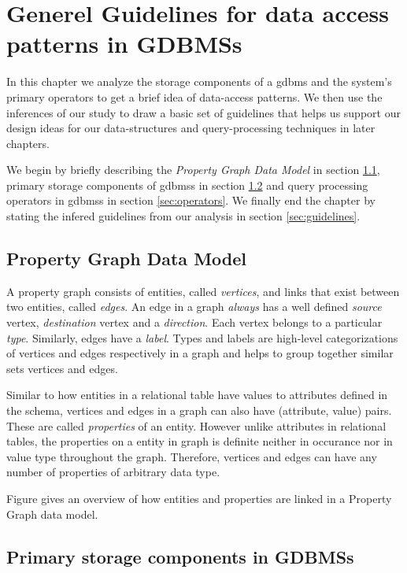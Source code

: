 \chapter{Generel Guidelines for data access patterns in GDBMSs}
\label{guidelines}

In this chapter we analyze the storage components of a \gls{gdbms} and the system's primary operators to get a brief idea of data-access patterns. We then use the inferences of our study to draw a basic set of guidelines that helps us support our design ideas for our data-structures and query-processing techniques in later chapters.

We begin by briefly describing the \emph{Property Graph Data Model} in section \ref{sec:property-graph-data-model}, primary storage components of \gls{gdbms}s in section \ref{sec:storage-components} and query processing operators in \gls{gdbms}s in section \ref{sec:operators}. We finally end the chapter by stating the infered guidelines from our analysis in section \ref{sec:guidelines}.

\section{Property Graph Data Model}
\label{sec:property-graph-data-model}

A property graph consists of entities, called \emph{vertices}, and links that exist between two entities, called \emph{edges}. An edge in a graph \emph{always} has a well defined \emph{source} vertex, \emph{destination} vertex and a \emph{direction}. Each vertex belongs to a particular \emph{type}. Similarly, edges have a \emph{label}. Types and labels are high-level categorizations of vertices and edges respectively in a graph and helps to group together similar sets vertices and edges.

Similar to how entities in a relational table have values to attributes defined in the schema, vertices and edges in a graph can also have (attribute, value) pairs. These are called \emph{properties} of an entity. However unlike attributes in relational tables, the properties on a entity in graph is definite neither in occurance nor in value type throughout the graph. Therefore, vertices and edges can have any number of properties of arbitrary data type.

Figure \cite{property} gives an overview of how entities and properties are linked in a Property Graph data model.

\section{Primary storage components in GDBMSs}
\label{sec:storage-components}

